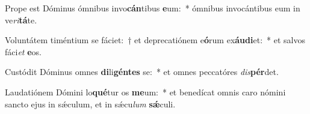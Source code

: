 \item Prope est Dóminus ómnibus invo\textbf{cán}tibus \textbf{e}um:~* ómnibus invocántibus eum in ve\textit{ri}\textbf{tá}te.
\item Voluntátem timéntium se fáciet:~† et deprecatiónem e\textbf{ó}rum ex\textbf{áu}\textbf{di}et:~* et salvos fáci\textit{et} \textbf{e}os.
\item Custódit Dóminus omnes \textbf{di}li\textbf{gén}\textbf{tes} se:~* et omnes peccatóres \textit{dis}\textbf{pér}det.
\item Laudatiónem Dómini lo\textbf{qué}tur os \textbf{me}um:~* et benedícat omnis caro nómini sancto ejus in sǽculum, et in sǽcu\textit{lum} \textbf{sǽ}culi.
